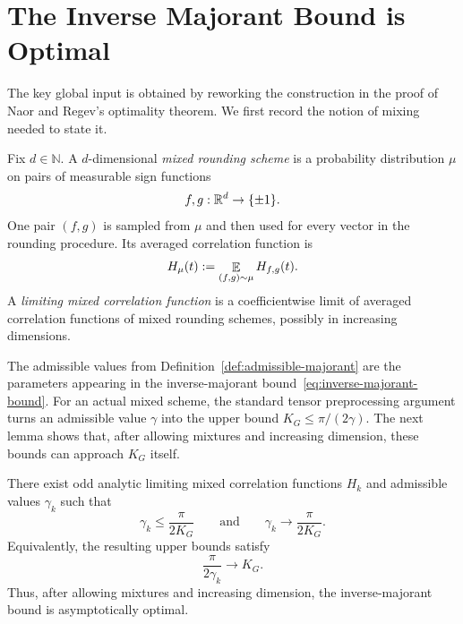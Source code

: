 \section{The Inverse Majorant Bound is Optimal}
\label{sec:majorant_optimal}

The key global input is obtained by reworking the construction in the proof of Naor and Regev's optimality theorem. We first record the notion of mixing needed to state it.

\begin{definition}\label{def:mixed-rounding}
Fix $d\in\mathbb N$. A $d$-dimensional \emph{mixed rounding scheme} is a probability distribution $\mu$ on pairs of measurable sign functions
\[
        f,g:\mathbb{R}^d\to\{\pm1\}.
\]
One pair $(f,g)$ is sampled from $\mu$ and then used for every vector in the rounding procedure. Its averaged correlation function is
\[
        H_\mu(t):=\mathop{\mathbb{E}}_{(f,g)\sim\mu}H_{f,g}(t).
\]
A \emph{limiting mixed correlation function} is a coefficientwise limit of averaged correlation functions of mixed rounding schemes, possibly in increasing dimensions.
\end{definition}

The admissible values from Definition~\ref{def:admissible-majorant} are the parameters appearing in the inverse-majorant bound~\eqref{eq:inverse-majorant-bound}. For an actual mixed scheme, the standard tensor preprocessing argument turns an admissible value $\gamma$ into the upper bound $K_G\le\pi/(2\gamma)$. The next lemma shows that, after allowing mixtures and increasing dimension, these bounds can approach $K_G$ itself.

\begin{lemma}\label{lem:inverse-majorant-optimal}
There exist odd analytic limiting mixed correlation functions $H_k$ and admissible values $\gamma_k$ such that
\[
        \gamma_k\le\frac{\pi}{2K_G}
        \qquad\text{and}\qquad
        \gamma_k\longrightarrow\frac{\pi}{2K_G}.
\]
Equivalently, the resulting upper bounds satisfy
\[
        \frac{\pi}{2\gamma_k}\longrightarrow K_G.
\]
Thus, after allowing mixtures and increasing dimension, the inverse-majorant bound is asymptotically optimal.
\end{lemma}

